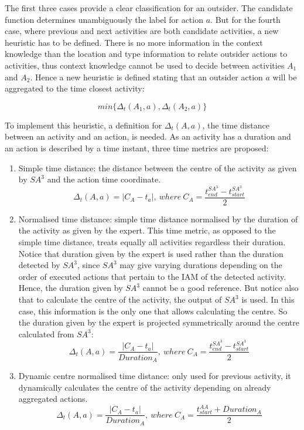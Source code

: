 The first three cases provide a clear classification for an outsider. The candidate function determines unambiguously the label for action $a$. But for the fourth case, where previous and next activities are both candidate activities, a new heuristic has to be defined. There is no more information in the context knowledge than the location and type information to relate outsider actions to activities, thus context knowledge cannot be used to decide between activities $A_1$ and $A_2$. Hence a new heuristic is defined stating that an outsider action $a$ will be aggregated to the time closest activity:

\begin{equation}
 min\{\Delta_t(A_1, a), \Delta_t(A_2, a)\}
\end{equation}

To implement this heuristic, a definition for $\Delta_t(A, a)$, the time distance between an activity and an action, is needed. As an activity has a duration and an action is described by a time instant, three time metrics are proposed:

\begin{enumerate}
 \item Simple time distance: the distance between the centre of the activity as given by $SA^3$ and the action time coordinate.
 \begin{equation}
 \label{eq-t1}
  \Delta_t(A, a) = | C_A - t_a |,\ where \ C_A = \frac{t_{end} ^{SA^3} - t_{start} ^{SA^3}}{2}
 \end{equation}
 \item Normalised time distance: simple time distance normalised by the duration of the activity as given by the expert. This time metric, as opposed to the simple time distance, treats equally all activities regardless their duration. Notice that duration given by the expert is used rather than the duration detected by $SA^3$, since $SA^3$ may give varying durations depending on the order of executed actions that pertain to the IAM of the detected activity. Hence, the duration given by $SA^3$ cannot be a good reference. But notice also that to calculate the centre of the activity, the output of $SA^3$ is used. In this case, this information is the only one that allows calculating the centre. So the duration given by the expert is projected symmetrically around the centre calculated from $SA^3$:
 \begin{equation}
 \label{eq-t2}
  \Delta_t(A, a) = \frac{| C_A - t_a |}{Duration_A} ,\ where \ C_A = \frac{t_{end} ^{SA^3} - t_{start} ^{SA^3}}{2}
 \end{equation}
 \item Dynamic centre normalised time distance: only used for previous activity, it dynamically calculates the centre of the activity depending on already aggregated actions.
 \begin{equation}
 \label{eq-t3}
  \Delta_t(A, a) = \frac{| C_A - t_a |}{Duration_A} ,\ where \ C_A = \frac{t_{start} ^{AA} + Duration_A}{2}
 \end{equation}
\end{enumerate}

